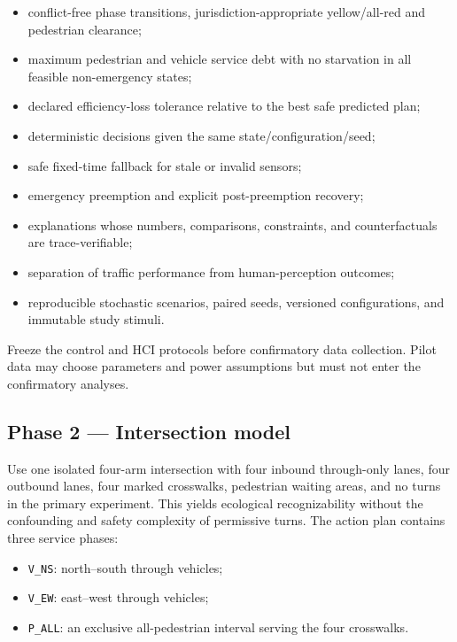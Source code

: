 \documentclass[
  english,
  11pt,
  a4paper,
]{article}
\providecommand{\tightlist}{%
  \setlength{\itemsep}{0pt}\setlength{\parskip}{0pt}}
\begin{document}
\begin{itemize}
\tightlist
\item
  conflict-free phase transitions, jurisdiction-appropriate
  yellow/all-red and pedestrian clearance;
\item
  maximum pedestrian and vehicle service debt with no starvation in all
  feasible non-emergency states;
\item
  declared efficiency-loss tolerance relative to the best safe predicted
  plan;
\item
  deterministic decisions given the same state/configuration/seed;
\item
  safe fixed-time fallback for stale or invalid sensors;
\item
  emergency preemption and explicit post-preemption recovery;
\item
  explanations whose numbers, comparisons, constraints, and
  counterfactuals are trace-verifiable;
\item
  separation of traffic performance from human-perception outcomes;
\item
  reproducible stochastic scenarios, paired seeds, versioned
  configurations, and immutable study stimuli.
\end{itemize}

Freeze the control and HCI protocols before confirmatory data
collection. Pilot data may choose parameters and power assumptions but
must not enter the confirmatory analyses.

\subsection{Phase 2 --- Intersection
model}\label{phase-2-intersection-model}

Use one isolated four-arm intersection with four inbound through-only
lanes, four outbound lanes, four marked crosswalks, pedestrian waiting
areas, and no turns in the primary experiment. This yields ecological
recognizability without the confounding and safety complexity of
permissive turns. The action plan contains three service phases:

\begin{itemize}
\tightlist
\item
  \texttt{V\_NS}: north--south through vehicles;
\item
  \texttt{V\_EW}: east--west through vehicles;
\item
  \texttt{P\_ALL}: an exclusive all-pedestrian interval serving the four
  crosswalks.
\end{itemize}
\end{document}
